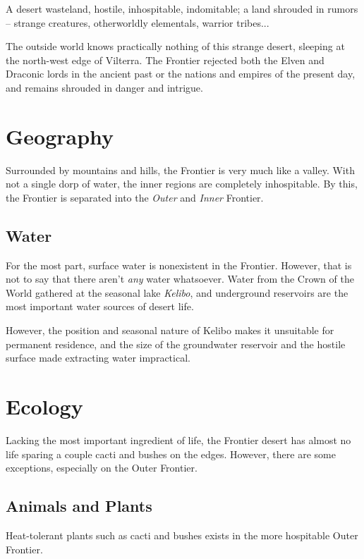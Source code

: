 \documentclass[../main.tex]{subfiles}
\begin{document}
 A desert wasteland, hostile,
inhospitable, indomitable; a land shrouded in rumors --
strange creatures, otherworldly elementals,
warrior tribes...

The outside world knows practically nothing of this strange desert,
sleeping at the north-west edge of Vilterra. The Frontier rejected both the Elven
and Draconic lords in the ancient past or the nations and empires of the present
day, and remains shrouded in danger and intrigue.

\section{Geography}
Surrounded by mountains and hills, the Frontier is very much like a valley.
With not a single dorp of water, the inner regions are completely inhospitable.
By this, the Frontier is separated into the \emph{Outer} and \emph{Inner}
Frontier.

\subsection{Water}
For the most part, surface water is nonexistent in the Frontier. However,
that is not to say that there aren't \emph{any} water whatsoever.
Water from the Crown of the World gathered at the seasonal lake \emph{Kelibo},
and underground reservoirs are the most important water sources of desert
life.

However, the position and seasonal nature of
Kelibo makes it unsuitable for permanent residence, and the size of the
groundwater reservoir and the hostile surface made extracting water impractical.

\section{Ecology}
Lacking the most important ingredient of life, the Frontier desert has
almost no life sparing a couple cacti and bushes on the edges. However,
there are some exceptions, especially on the Outer Frontier.

\subsection{Animals and Plants}
Heat-tolerant plants such as cacti and bushes exists in the more
hospitable Outer Frontier.
\end{document}
